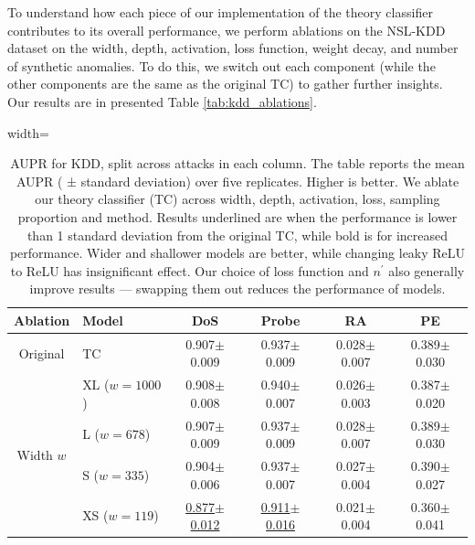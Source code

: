 \documentclass{article}
\begin{document}
To understand how each piece of our implementation of the theory classifier contributes to its overall performance, we perform ablations on the NSL-KDD dataset on the width, depth, activation, loss function, weight decay, and number of synthetic anomalies.
To do this, we switch out each component (while the other components are the same as the original TC) to gather further insights.
Our results are in presented Table \ref{tab:kdd_ablations}.
\begin{table}[]
    \centering
    \caption{AUPR for KDD, split across attacks in each column.  The table reports the mean AUPR (
± standard deviation) over five replicates. Higher is better. We ablate our theory classifier (TC) across 
    width, depth, activation, loss, sampling proportion and method.
    Results underlined are when the performance is lower than 1 standard deviation from the original TC, while bold is for increased performance.
    Wider and shallower models are better, while changing leaky ReLU to ReLU has insignificant effect.
    Our choice of loss function and $n^\prime$ also generally improve results --- swapping them out reduces the performance of models.
    }
  \begin{adjustbox}{width=\textwidth}
    \begin{tabular}{cl|cccc}
    \toprule
        Ablation & Model & DoS & Probe & RA & PE \\%
        \midrule
        Original & TC & 0.907$\pm$0.009 & 0.937$\pm$0.009 & 0.028$\pm$0.007 & 0.389$\pm$0.030 \\
        \midrule
        \midrule
\multirow{5}{*}{Width $w$}  & XL ($w=1000$) & 0.908$\pm$0.008 & 0.940$\pm$0.007 & 0.026$\pm$0.003 & 0.387$\pm$0.020 \\
 & L ($w=678$) & 0.907$\pm$0.009 & 0.937$\pm$0.009 & 0.028$\pm$0.007 & 0.389$\pm$0.030  \\
& S ($w=335$) & 0.904$\pm$0.006 & 0.937$\pm$0.007 & 0.027$\pm$0.004 & 0.390$\pm$0.027 \\
& XS ($w=119$) & \underline{0.877$\pm$0.012} & \underline{0.911$\pm$0.016} & 0.021$\pm$0.004 & 0.360$\pm$0.041 \\

\end{tabular}
\end{adjustbox}
\end{table}
\end{document}
